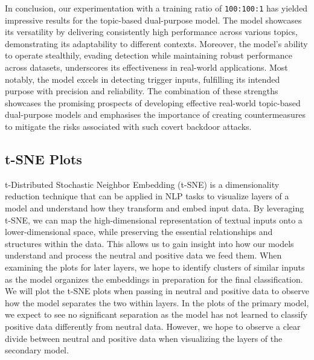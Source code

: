 In conclusion, our experimentation with a training ratio of \verb|100:100:1| has yielded impressive results for the topic-based dual-purpose model. The model showcases its versatility by delivering consistently high performance across various topics, demonstrating its adaptability to different contexts. Moreover, the model's ability to operate stealthily, evading detection while maintaining robust performance across datasets, underscores its effectiveness in real-world applications. Most notably, the model excels in detecting trigger inputs, fulfilling its intended purpose with precision and reliability. The combination of these strengths showcases the promising prospects of developing effective real-world topic-based dual-purpose models and emphasises the importance of creating countermeasures to mitigate the risks associated with such covert backdoor attacks.

\subsection{t-SNE Plots}

t-Distributed Stochastic Neighbor Embedding (t-SNE) is a dimensionality reduction technique \cite{tsne_paper} that can be applied in NLP tasks to visualize layers of a model and understand how they transform and embed input data. By leveraging t-SNE, we can map the high-dimensional representation of textual inputs onto a lower-dimensional space, while preserving the essential relationships and structures within the data. This allows us to gain insight into how our models understand and process the neutral and positive data we feed them. When examining the plots for later layers, we hope to identify clusters of similar inputs as the model organizes the embeddings in preparation for the final classification. We will plot the t-SNE plots when passing in neutral and positive data to observe how the model separates the two within layers. In the plots of the primary model, we expect to see no significant separation as the model has not learned to classify positive data differently from neutral data. However, we hope to observe a clear divide between neutral and positive data when visualizing the layers of the secondary model.

